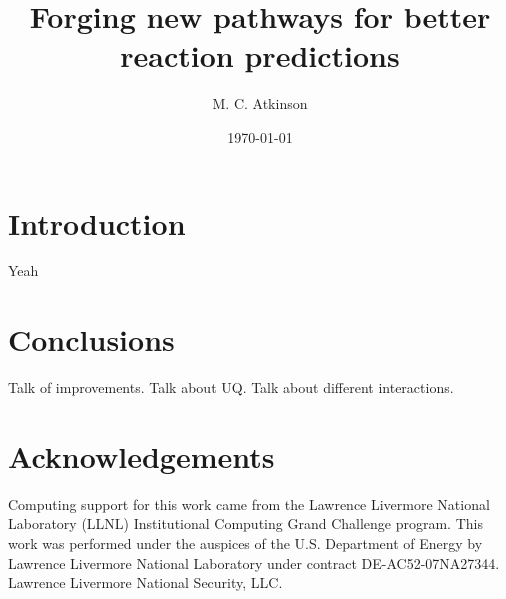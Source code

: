 \documentclass[showpacs,prc,aps,floatfix,hidelinks]{revtex4-1}
\begin{document}
\title{Forging new pathways for better reaction predictions}
\author{M. C. Atkinson} 

\date{\today}

\maketitle

\section{Introduction}
\label{sec:intro}

Yeah


\section{Conclusions}
\label{sec:conc}

Talk of improvements. Talk about UQ. Talk about different interactions. 

\section{Acknowledgements}
\label{sec:ack}

Computing support for this work came from the Lawrence Livermore National Laboratory (LLNL) Institutional Computing Grand Challenge program. This work was performed under the auspices of the U.S. Department of Energy by Lawrence Livermore National Laboratory under contract DE-AC52-07NA27344. Lawrence Livermore National Security, LLC. 



\end{document}
